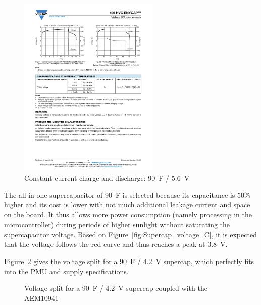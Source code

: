\documentclass{EPL-master-thesis-covers-EN}
\begin{document}
\begin{figure}[H]
    \centering
    \includegraphics[width=0.6\textwidth]{196hvc-12.pdf}
    \caption[Constant current charge and discharge: \SI{90}{F} / \SI{5.6}{V}]{Constant current charge and discharge: \SI{90}{F} / \SI{5.6}{V}~\cite{Vishay}}
    \label{fig:hvc}
\end{figure}

The all-in-one supercapacitor of \SI{90}{F} is selected because its capacitance is 50\% higher and its cost is lower with not much additional leakage current and space on the board. It thus allows more power consumption (namely processing in the microcontroller) during periods of higher sunlight without saturating the supercapacitor voltage. Based on Figure~\ref{fig:Supercap_voltage_C}, it is expected that the voltage follows the red curve and thus reaches a peak at \SI{3.8}{V}.

Figure~\ref{fig:Supercap_voltage_voltage_split} gives the voltage split for a \SI{90}{F} / \SI{4.2}{V} supercap, which perfectly fits into the PMU and supply specifications.

\begin{figure}[H]
\centering
{}
\caption{Voltage split for a \SI{90}{F} / \SI{4.2}{V} supercap coupled with the AEM10941}
\label{fig:Supercap_voltage_voltage_split}
\end{figure}
\end{document}
